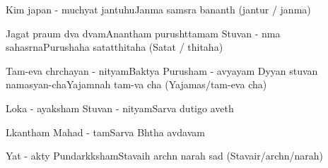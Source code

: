 \documentclass[20pt]{article}
\begin{document}
{Kim japan - muchyat jantuhu}{Janma samsra bananth (jantur / janma)}

{Jagat praum dva dvam}{Anantham purushttamam} 
{Stuvan - nma sahasrna}{Purushaha satatthitaha (Satat / thitaha)}

\newpage
\slokash
{Tam-eva chrchayan - nityam}{Baktya Purusham - avyayam}
{Dyyan stuvan namasyan-cha}{Yajamnah tam-va cha (Yajamas/tam-eva cha)}


{Loka - ayaksham Stuvan - nityam}{Sarva dutigo aveth}

{Lkantham Mahad - tam}{Sarva Bhtha avdavam}

{Yat - akty Pundarkksham}{Stavaih archn narah sad (Stavair/archn/narah)}
\end{document}
